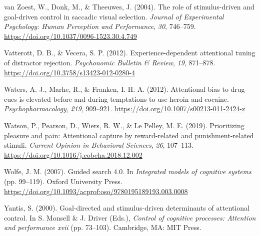 \documentclass[man, a4paper, noextraspace, 11pt,floatsintext]{apa6}
\theoremstyle{definition}
\theoremstyle{definition}
\theoremstyle{definition}
\theoremstyle{remark}
\begin{document}
\hypertarget{ref-VanZoest2004}{}
van Zoest, W., Donk, M., \& Theeuwes, J. (2004). The role of
stimulus-driven and goal-driven control in saccadic visual selection.
\emph{Journal of Experimental Psychology: Human Perception and
Performance}, \emph{30}, 746--759.
\url{https://doi.org/10.1037/0096-1523.30.4.749}

\hypertarget{ref-Vatterott2012}{}
Vatterott, D. B., \& Vecera, S. P. (2012). Experience-dependent
attentional tuning of distractor rejection. \emph{Psychonomic Bulletin
\& Review}, \emph{19}, 871--878.
\url{https://doi.org/10.3758/s13423-012-0280-4}

\hypertarget{ref-Waters2012}{}
Waters, A. J., Marhe, R., \& Franken, I. H. A. (2012). Attentional bias
to drug cues is elevated before and during temptations to use heroin and
cocaine. \emph{Psychopharmacology}, \emph{219}, 909--921.
\url{https://doi.org/10.1007/s00213-011-2424-z}

\hypertarget{ref-Watson2019}{}
Watson, P., Pearson, D., Wiers, R. W., \& Le Pelley, M. E. (2019).
Prioritizing pleasure and pain: Attentional capture by reward-related
and punishment-related stimuli. \emph{Current Opinion in Behavioral
Sciences}, \emph{26}, 107--113.
\url{https://doi.org/10.1016/j.cobeha.2018.12.002}

\hypertarget{ref-Wolfe2007}{}
Wolfe, J. M. (2007). Guided search 4.0. In \emph{Integrated models of
cognitive systems} (pp. 99--119). Oxford University Press.
\url{https://doi.org/10.1093/acprof:oso/9780195189193.003.0008}

\hypertarget{ref-Yantis2000}{}
Yantis, S. (2000). Goal-directed and stimulus-driven determinants of
attentional control. In S. Monsell \& J. Driver (Eds.), \emph{Control of
cognitive processes: Attention and performance xvii} (pp. 73--103).
Cambridge, MA: MIT Press.

\endgroup
\end{document}
